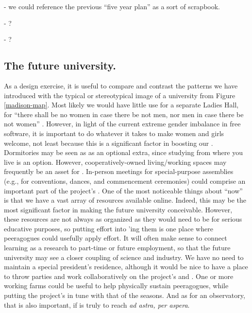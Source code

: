  - we could reference the previous ``five year
plan'' as a sort of scrapbook.

 - ?

 - ?

\subsection{The future university.}
As a design exercise, it is useful to compare and contrast the
patterns we have introduced with the typical or stereotypical image of
a university from Figure \ref{madison-map}.  Most likely we would have
little use for a separate Ladies Hall, for ``there shall be no women
in case there be not men, nor men in case there be not women''
\cite[Chapter 1.LII]{rabelais1894gargantua}.  However, in light of the
current extreme gender imbalance in free software, it is important to
do whatever it takes to make women and girls welcome, not least
because this is a significant factor in boosting our
.  Dormitories may be seen as as an
optional extra, since studying from where you live is an option.
However, cooperatively-owned living/working spaces may frequently be
an asset for .  In-person meetings for
special-purpose assemblies (e.g., for conventions, dances, and
commencement ceremonies) could comprise an important part of the
project's .  One of the most noticeable things
about ``now'' is that we have a vast array of resources available
online.  Indeed, this may be the most significant factor in making the
future university conceivable.  However, these resources are not
always as organized as they would need to be for serious educative
purposes, so putting effort into 'ing them is one place where peeragogues could usefully
apply effort.  It will often make sense to connect learning as a
research  to part-time or future employment, so
that the future university may see a closer coupling of science and
industry.  We have no need to maintain a special president's
residence, although it would be nice to have a place to throw parties
and work collaboratively on the project's  and
.  One or more working farms could be useful to
help physically sustain peeragogues, while putting the project's
 in tune with that of the seasons.  And as for
an observatory, that is also important, if  is
truly to reach \emph{ad astra, per aspera}.


  

